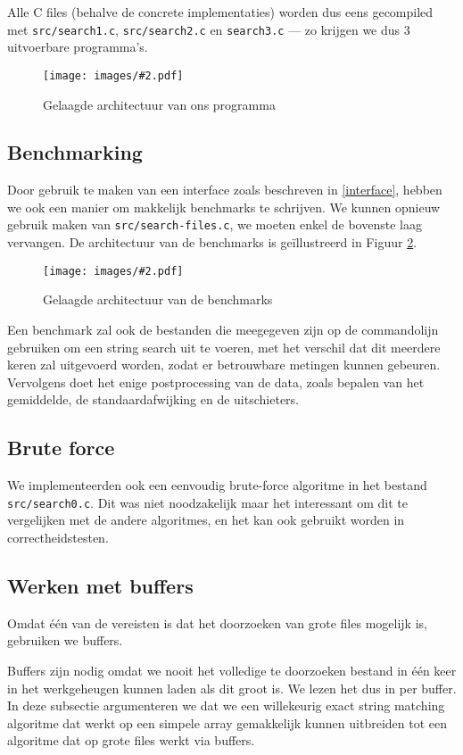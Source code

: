 \documentclass[a4paper,11pt]{article}
\newcommand{\image}[3][1]{
    \begin{figure}
    \begin{center}
    \texttt{[image: images/\#2.pdf]}
    \caption{#3}
    \label{fig:#2}
    \end{center}
    \end{figure}
}
\begin{document}
Alle C files (behalve de concrete implementaties) worden dus eens gecompiled met
\verb#src/search1.c#, \verb#src/search2.c# en \verb#search3.c# — zo krijgen we
dus 3 uitvoerbare programma's.

\image[0.6]{layers-main}{Gelaagde architectuur van ons programma}

\subsection{Benchmarking}

Door gebruik te maken van een interface zoals beschreven in \ref{interface},
hebben we ook een manier om makkelijk benchmarks te schrijven. We kunnen opnieuw
gebruik maken van \verb#src/search-files.c#, we moeten enkel de bovenste laag
vervangen. De architectuur van de benchmarks is ge\"illustreerd in Figuur
\ref{fig:layers-bench}.

\image[0.6]{layers-bench}{Gelaagde architectuur van de benchmarks}

Een benchmark zal ook de bestanden die meegegeven zijn op de commandolijn
gebruiken om een string search uit te voeren, met het verschil dat dit meerdere
keren zal uitgevoerd worden, zodat er betrouwbare metingen kunnen gebeuren.
Vervolgens doet het enige postprocessing van de data, zoals bepalen van het
gemiddelde, de standaardafwijking en de uitschieters.

\subsection{Brute force}

We implementeerden ook een eenvoudig brute-force algoritme in het bestand
\verb#src/search0.c#. Dit was niet noodzakelijk maar het interessant om dit te
vergelijken met de andere algoritmes, en het kan ook gebruikt worden in
correctheidstesten.

\subsection{Werken met buffers}
\label{buffers}

Omdat \'e\'en van de vereisten is dat het doorzoeken van grote files mogelijk
is, gebruiken we buffers.

Buffers zijn nodig omdat we nooit het volledige te doorzoeken bestand in \'e\'en
keer in het werkgeheugen kunnen laden als dit groot is. We lezen het dus in per
buffer. In deze subsectie argumenteren we dat we een willekeurig exact string
matching algoritme dat werkt op een simpele array gemakkelijk kunnen uitbreiden
tot een algoritme dat op grote files werkt via buffers.
\end{document}
